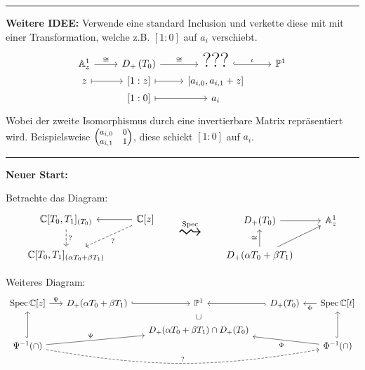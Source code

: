 \begin{center} \rule{0.7\textwidth}{0.4pt} \end{center}

\textbf{Weitere IDEE:}
Verwende eine standard Inclusion und verkette diese mit mit einer
Transformation, welche z.B. $[1:0]$ auf $a_i$ verschiebt.
\[ \begin{tikzcd}[row sep=0]
\A_z^1 \rar{\cong}& D_+\left(T_0\right) \rar{\cong}
  &{\text{\huge???}} \rar[hook]{\iota} & \P^1\\
z \arrow[|->]{r}& {[1:z]} \rar[|->] & {[a_{i,0},a_{i,1}+z]}\\
  & {[1:0]} \arrow[|->]{r}& a_i
\end{tikzcd} \]
Wobei der zweite Isomorphismus durch eine invertierbare Matrix repräsentiert
wird. Beispielsweise $\footnotesize\begin{pmatrix}a_{i,0} & 0\\ a_{i,1} & 1
\end{pmatrix}$, diese schickt $[1:0]$ auf $a_i$.

\begin{center} \rule{0.7\textwidth}{0.4pt} \end{center}

\textbf{Neuer Start:}
\begin{comment}
Frage: Welche Automorphismen hat man auf $D_+(T_0)$ oder $\A_z^1$?\\
Antwort: \TODO
\end{comment}

Betrachte das Diagram:
\[
\begin{tikzcd}
\C[T_0,T_1]_{(T_0)} \dar[dashed]{?}
& \C[z] \lar \arrow[dashed]{ld}{?}
\\
\C[T_0,T_1]_{(\alpha T_0+\beta T_1)}
\end{tikzcd}
\qquad\overset{\Spec}{\text{\Huge$\rightsquigarrow$}}\qquad
\begin{tikzcd}
D_+(T_0) \rar
& \A_z^1
\\
D_+(\alpha T_0+\beta T_1) \uar{\cong} \arrow{ur}
\end{tikzcd}
\]

Weiteres Diagram:
\[
\begin{tikzcd}[row sep=0,column sep=1.5em]
\Spec \C[z] \rar{\Psi}
  & D_+(\alpha T_0+\beta T_1) \rar[hook]
  & \P^1 
  & D_+(T_0) \lar[hook]
  & \Spec \C[t] \lar{\Phi}
\\ && \cup
\\ 
&& D_+(\alpha T_0+\beta T_1) \cap D_+(T_0)
\\
\Psi^{-1}(\cap) \ar[hook]{uuu} \ar{rru}{\Psi} \ar[bend right=10,dashed]{rrrr}{?}
& & & &
\Phi^{-1}(\cap) \ar[hook]{uuu} \ar{llu}{\Phi}
\end{tikzcd}
\]

